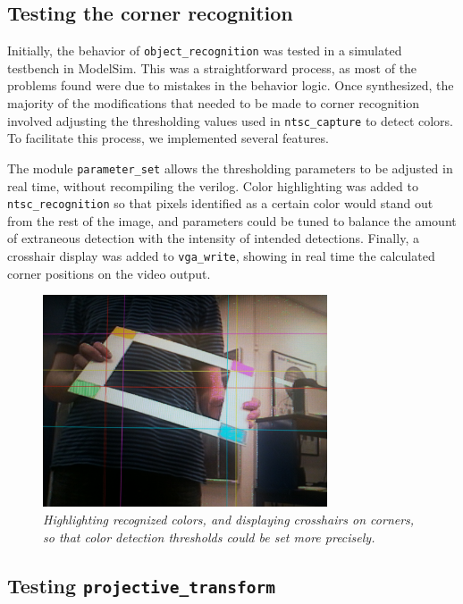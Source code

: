 \documentclass[10pt]{article}
\begin{document}
\subsection{Testing the corner recognition}

Initially, the behavior of {\tt object\_recognition} was tested in a simulated testbench in ModelSim. This was a straightforward process, as most of the problems found were due to mistakes in the behavior logic. Once synthesized, the majority of the modifications that needed to be made to corner recognition involved adjusting the thresholding values used in {\tt ntsc\_capture} to detect colors. To facilitate this process, we implemented several features.

The module {\tt parameter\_set} allows the thresholding parameters to be adjusted in real time, without recompiling the verilog. Color highlighting was added to {\tt ntsc\_recognition} so that pixels identified as a certain color would stand out from the rest of the image, and parameters could be tuned to balance the amount of extraneous detection with the intensity of intended detections. Finally, a crosshair display was added to {\tt vga\_write}, showing in real time the calculated corner positions on the video output.

\begin{figure}[h!]
\centering
\includegraphics[width=0.75\textwidth]{images/IMG_0131.JPG}
\caption{\emph{Highlighting recognized colors, and displaying crosshairs on corners, so that color detection thresholds could be set more precisely.}}
\end{figure}

\subsection{Testing {\tt projective\_transform}}
\end{document}
